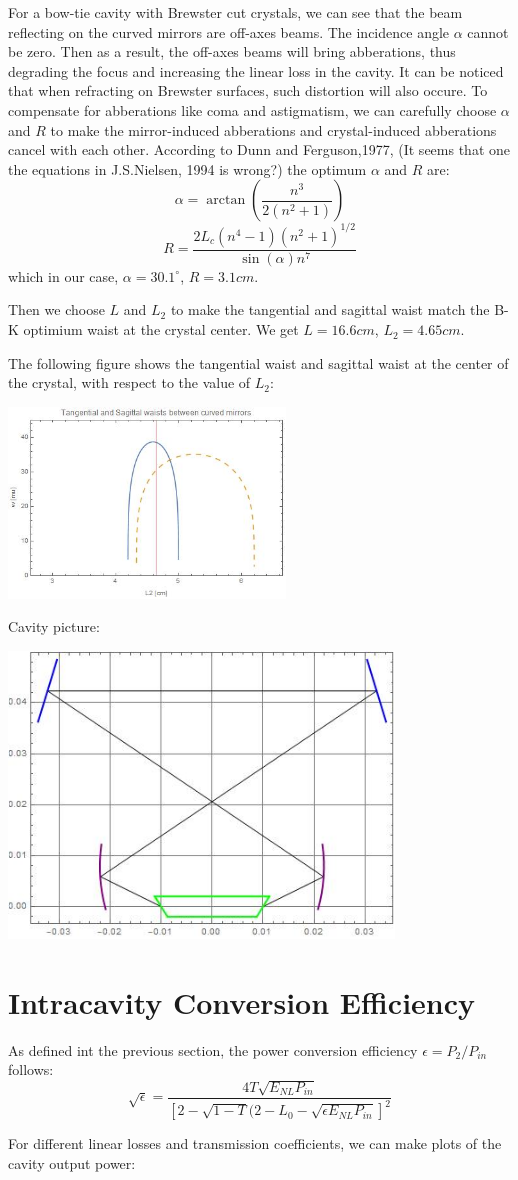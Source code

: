 \documentclass{article}
\begin{document}
For a bow-tie cavity with Brewster cut crystals, we can see that the beam reflecting on the curved mirrors are off-axes beams. The incidence angle $\alpha$ cannot be zero. Then as a result, the off-axes beams will bring abberations, thus degrading the focus and increasing the linear loss in the cavity. It can be noticed that when refracting on Brewster surfaces, such distortion will also occure. To compensate for abberations like coma and astigmatism, we can carefully choose $\alpha$ and $R$ to make the mirror-induced abberations and crystal-induced abberations cancel with each other. 
According to Dunn and Ferguson,1977, (It seems that one the equations in J.S.Nielsen, 1994 is wrong?) the optimum $\alpha$ and $R$ are:
$$\alpha=\arctan{(\frac{n^3}{2(n^2+1)})}$$
$$R=\frac{2L_c(n^4-1)(n^2+1)^{1/2}}{\sin{(\alpha)}n^7}$$
which in our case, $\alpha=30.1^{\circ}$, $R=3.1cm$.

Then we choose $L$ and $L_2$ to make the tangential and sagittal waist match the B-K optimium waist at the crystal center. We get $L=16.6cm$, $L_2=4.65cm$.

The following figure shows the tangential waist and sagittal waist at the center of the crystal, with respect to the value of $L_2$:

\includegraphics[height=2in]{bcutel1.JPG}

Cavity picture:

\includegraphics[height=3in]{bcutel2.JPG}

\section{Intracavity Conversion Efficiency}
As defined int the previous section, the power conversion efficiency $\epsilon=P_2/P_{in}$ follows:
$$\sqrt{\epsilon}=\frac{4T\sqrt{E_{NL}P_{in}}}{[2-\sqrt{1-T}(2-L_0-\sqrt{{\epsilon}E_{NL}P_{in}}]^2}$$

For different linear losses and transmission coefficients, we can make plots of the cavity output power:
\end{document}
